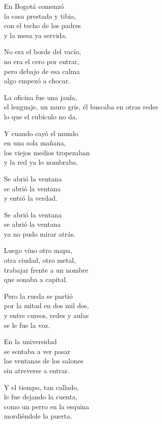 \begin{lyrics}
En Bogotá comenzó\\
la casa prestada y tibia,\\
con el techo de los padres\\
y la mesa ya servida.

No era el borde del vacío,\\
no era el cero por entrar,\\
pero debajo de esa calma\\
algo empezó a chocar.

La oficina fue una jaula,\\
el lenguaje, un muro gris,
él buscaba en otras redes\\
lo que el cubículo no da.

Y cuando cayó el mundo\\
en una sola mañana,\\
los viejos medios tropezaban\\
y la red ya lo nombraba.

Se abrió la ventana\\
se abrió la ventana\\
y entró la verdad.

Se abrió la ventana\\
se abrió la ventana\\
ya no pudo mirar atrás.

Luego vino otro mapa,\\
otra ciudad, otro metal,\\
trabajar frente a un nombre\\
que sonaba a capital.

Pero la rueda se partió\\
por la mitad en dos mil dos,\\
y entre cursos, redes y aulas\\
se le fue la voz.

En la universidad\\
se sentaba a ver pasar\\
las ventanas de los salones\\
sin atreverse a entrar.

Y el tiempo, tan callado,\\
le fue dejando la cuenta,\\
como un perro en la esquina\\
mordiéndole la puerta.


\end{lyrics}
